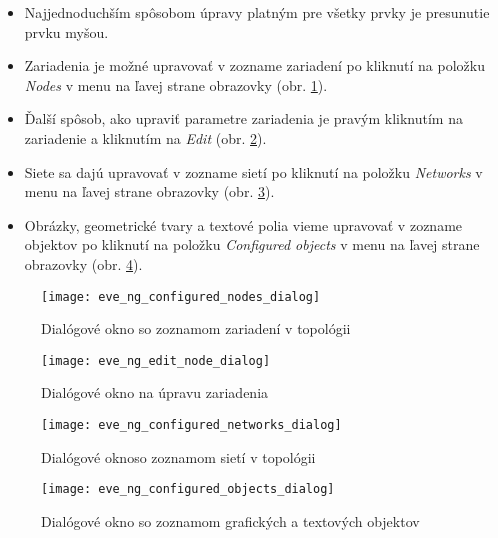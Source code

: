 \begin{enumerate}[noitemsep]
    \begin{itemize}[noitemsep]
        \item Najjednoduchším spôsobom úpravy platným pre všetky prvky je presunutie prvku myšou.
        \item Zariadenia je možné upravovať v zozname zariadení po kliknutí na položku \emph{Nodes} v menu na ľavej strane obrazovky (obr. \ref{obr:eve_ng_configured_nodes_dialog}).
        \item Ďalší spôsob, ako upraviť parametre zariadenia je pravým kliknutím na zariadenie a kliknutím na \emph{Edit} (obr. \ref{obr:eve_ng_edit_node_dialog}).
        \item Siete sa dajú upravovať v zozname sietí po kliknutí na položku \emph{Networks} v menu na ľavej strane obrazovky (obr. \ref{obr:eve_ng_configured_networks_dialog}).
        \item Obrázky, geometrické tvary a textové polia vieme upravovať v zozname objektov po kliknutí na položku \emph{Configured objects} v menu na ľavej strane obrazovky (obr. \ref{obr:eve_ng_configured_objects_dialog}).
    \end{itemize}

\begin{figure}
    \centering
    \texttt{[image: eve\_ng\_configured\_nodes\_dialog]}
    \caption{Dialógové okno so zoznamom zariadení v topológii}
    \label{obr:eve_ng_configured_nodes_dialog}
\end{figure}

\begin{figure}
    \centering
    \texttt{[image: eve\_ng\_edit\_node\_dialog]}
    \caption{Dialógové okno na úpravu zariadenia}
    \label{obr:eve_ng_edit_node_dialog}
\end{figure}

\begin{figure}
    \centering
    \texttt{[image: eve\_ng\_configured\_networks\_dialog]}
    \caption{Dialógové oknoso zoznamom sietí v topológii}
    \label{obr:eve_ng_configured_networks_dialog}
\end{figure}

\begin{figure}
    \centering
    \texttt{[image: eve\_ng\_configured\_objects\_dialog]}
    \caption{Dialógové okno so zoznamom grafických a textových objektov}
    \label{obr:eve_ng_configured_objects_dialog}
\end{figure}




\end{enumerate}
